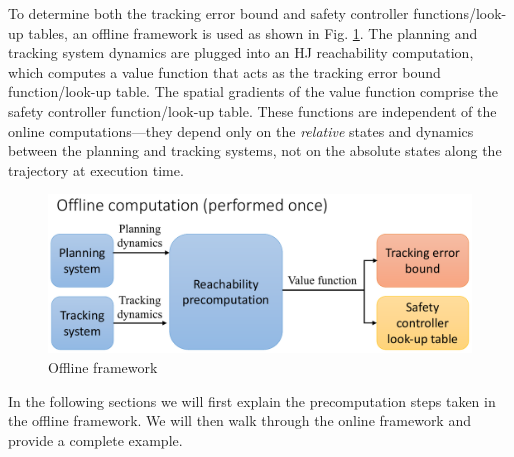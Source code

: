 To determine both the tracking error bound and safety controller functions/look-up tables, an offline framework is used as shown in Fig. \ref{fig:fw_offline}. The planning and tracking system dynamics are plugged into an HJ reachability computation, which computes a value function that acts as the tracking error bound function/look-up table. The spatial gradients of the value function comprise the safety controller function/look-up table. These functions are independent of the online computations---they depend only on the \textit{relative} states and dynamics between the planning and tracking systems, not on the absolute states along the trajectory at execution time.
\begin{figure}[h!]
  \centering
	\includegraphics[width=0.9\columnwidth]{fig/framework_offline}
	\caption{Offline framework}
	\label{fig:fw_offline}
\end{figure}
In the following sections we will first explain the precomputation steps taken in the offline framework. We will then walk through the online framework and provide a complete example.
%
%
